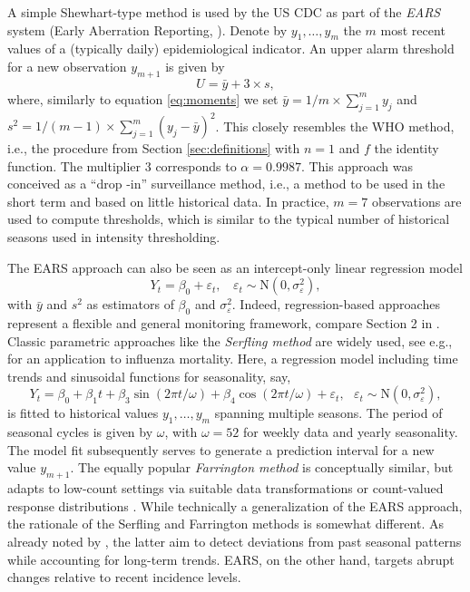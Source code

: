 \documentclass[12pt]{article}
\begin{document}
A simple Shewhart-type method is used by the US CDC as part of the \textit{EARS} system (Early Aberration Reporting, \citealt{Hutwagner2003}). Denote by $y_1, \dots, y_m$ the $m$ most recent values of a (typically daily) epidemiological indicator. An upper alarm threshold for a new observation $y_{m + 1}$ is given by
$$
U = \bar{y} + 3 \times s,
$$ 
where, similarly to equation \eqref{eq:moments} we set $\bar{y} = 1/m \times \sum_{j = 1}^m y_j$ and $s^2 = 1/(m - 1) \times \sum_{j = 1}^m (y_j - \bar{y})^2$. This closely resembles the WHO method, i.e., the procedure from Section \ref{sec:definitions} with $n = 1$ and $f$ the identity function. The multiplier 3 corresponds to $\alpha = 0.9987$. This approach was conceived as a ``drop -in'' surveillance method, i.e., a method to be used in the short term and based on little historical data. In practice, $m = 7$ observations are used to compute thresholds, which is similar to the typical number of historical seasons used in intensity thresholding.

The EARS approach can also be seen as an intercept-only linear regression model
$$
Y_{t} = \beta_0 + \varepsilon_{t}, \ \ \ \ \varepsilon_t \sim \text{N}(0, \sigma_\varepsilon^2),
$$
with $\bar{y}$ and $s^2$ as estimators of $\beta_0$ and $\sigma_\varepsilon^2$. Indeed, regression-based approaches represent a flexible and general monitoring framework, compare Section 2 in \cite{Unkel2012}. Classic parametric approaches like the \textit{Serfling method} \citep{Serfling1896} are widely used, see e.g., \cite{Thompson2009} for an application to influenza mortality. Here, a regression model including time trends and sinusoidal functions for seasonality, say,
\begin{equation}
Y_{t} = \beta_0 + \beta_1 t + \beta_3 \sin(2\pi t / \omega) + \beta_4 \cos(2\pi t / \omega) + \varepsilon_t, \ \ \ \varepsilon_t \sim \text{N}(0, \sigma_\varepsilon^2),
\label{eq:serfling}
\end{equation}
is fitted to historical values $y_1, \dots, y_m$ spanning multiple seasons. The period of seasonal cycles is given by $\omega$, with $\omega = 52$ for weekly data and yearly seasonality. The model fit subsequently serves to generate a prediction interval for a new value $y_{m + 1}$. The equally popular \textit{Farrington method} is conceptually similar, but adapts to low-count settings via suitable data transformations \citep{Farrington1996} or count-valued response distributions \citep{Noufaily2013}. While technically a generalization of the EARS approach, the rationale of the Serfling and Farrington methods is somewhat different. As already noted by \cite{Hutwagner2003}, the latter aim to detect deviations from past seasonal patterns while accounting for long-term trends. EARS, on the other hand, targets abrupt changes relative to recent incidence levels.
\end{document}
